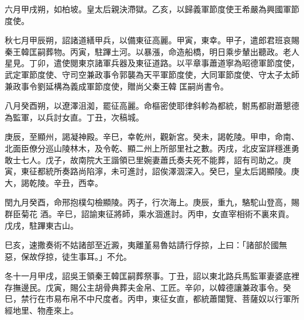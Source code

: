 \begin{pinyinscope}
 六月甲戌朔，如柏坡。皇太后親決滯獄。乙亥，以歸義軍節度使王希嚴為興國軍節度使。



 秋七月甲辰朔，詔諸道繕甲兵，以備東征高麗。甲寅，東幸。甲子，遣郎君班哀賜秦王韓匡嗣葬物。丙寅，駐蹕土河。以暴漲，命造船橋，明日乘步輦出聽政。老人星見。丁卯，遣使閱東京諸軍兵器及東征道路。以平章事蕭道寧為昭德軍節度使，武定軍節度使、守司空兼政事令郭襲為天平軍節度使，大同軍節度使、守太子太師兼政事令劉延構為義成軍節度使，贈尚父秦王韓
 匡嗣尚書令。



 八月癸酉朔，以遼澤沮洳，罷征高麗。命樞密使耶律斜軫為都統，駙馬都尉蕭懇德為監軍，以兵討女直。丁丑，次稿城。



 庚辰，至顯州，謁凝神殿。辛巳，幸乾州，觀新宮。癸未，謁乾陵。甲申，命南、北面臣僚分巡山陵林木，及令乾、顯二州上所部里社之數。丙戌，北皮室詳穩進勇敢士七人。戊子，故南院大王諧領已里婉妻蕭氏奏夫死不能葬，詔有司助之。庚寅，東征都統所奏路尚陷濘，未可進討，詔俟澤涸深入。癸巳，皇太后謁顯陵。庚大，謁乾陵。辛丑，西幸。



 閏九月癸酉，命邢抱樸勾檢顯陵。丙子，行次海上。庚辰，重九，駱駝山登高，賜群臣菊花
 酒。辛巳，詔諭東征將師，乘水涸進討。丙申，女直宰相術不裏來貢。戊戌，駐蹕東古山。



 巳亥，速撒奏術不姑諸部至近澱，夷離堇易魯姑請行俘掠，上曰：「諸部於國無惡，保故俘掠，徒生事耳。」不允。



 冬十一月甲戌，詔吳王領秦王韓匡嗣葬祭事。丁丑，詔以東北路兵馬監軍妻婆底裡存撫邊民。戊寅，賜公主胡骨典葬夫金帛、工匠。辛卯，以韓德讓兼政事令。癸巳，禁行在市易布帛不中尺度者。丙申，東征女直，都統蕭闥覽、菩薩奴以行軍所經地里、物產來上。



\end{pinyinscope}